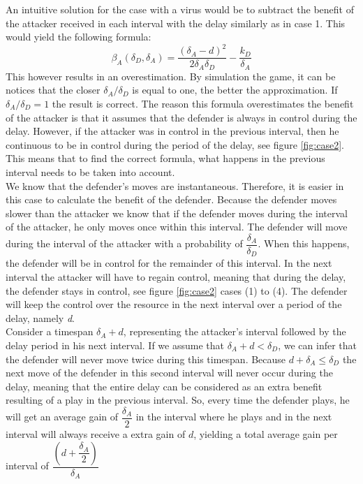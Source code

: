 An intuitive solution for the case with a virus would be to subtract the benefit of the attacker received in each interval with the delay similarly as in case 1. This would yield the following formula:
\begin{equation*}
\beta_{A}(\delta_{D},\delta_{A})=\dfrac{(\delta_{A} - d)^2}{2\delta_{A}\delta_{D}} - \dfrac{k_{D}}{\delta_{A}}
\end{equation*}
This however results in an overestimation. By simulation the game, it can be notices that the closer $\delta_{A}/\delta_{D}$ is equal to one, the better the approximation. If $\delta_{A}/\delta_{D} = 1$ the result is correct. The reason this formula overestimates the benefit of the attacker is that it assumes that the defender is always in control during the delay. However, if the attacker was in control in the previous interval, then he continuous to be in control during the period of the delay, see figure \ref{fig:case2}. This means that to find the correct formula, what happens in the previous interval needs to be taken into account. \\

We know that the defender's moves are instantaneous. Therefore, it is easier in this case to calculate the benefit of the defender. Because the defender moves slower than the attacker we know that if the defender moves during the interval of the attacker, he only moves once within this interval.
The defender will move during the interval of the attacker with a probability of $\dfrac{\delta_{A}}{\delta_{D}} $. When this happens, the defender will be in control for the remainder of this interval. In the next interval the attacker will have to regain control, meaning that during the delay, the defender stays in control, see figure \ref{fig:case2} cases (1) to (4). The defender will keep the control over the resource in the next interval over a period of the delay, namely \textit{d}. \\

Consider a timespan $\delta_{A} + d$, representing the attacker's interval followed by the delay period in his next interval. If we assume that $\delta_{A}+d<\delta_{D}$, we can infer that the defender will never move twice during this timespan.
Because $d + \delta_{A} \leq \delta_{D}$ the next move of the defender in this second interval will never occur during the delay, meaning that the entire delay can be considered as an extra benefit resulting of a play in the previous interval. 
So, every time the defender plays, he will get an average gain of $\dfrac{\delta_{A}}{2}$ in the interval where he plays and in the next interval will always receive a extra gain of $d$, yielding a total average gain per interval of
$\dfrac{(d+\dfrac{\delta_{A}}{2})}{\delta_{A}}$

